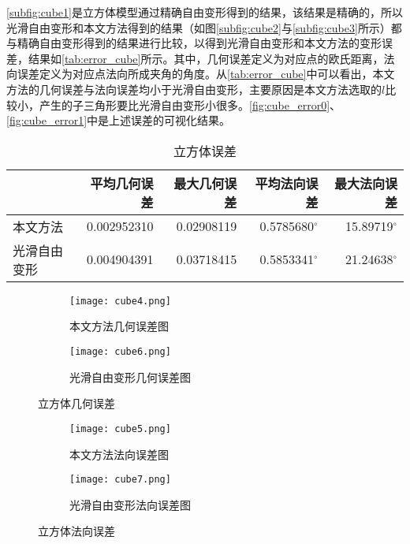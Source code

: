 \autoref{subfig:cube1}是立方体模型通过精确自由变形得到的结果，该结果是精确的，所以光滑自由变形和本文方法得到的结果（如图\autoref{subfig:cube2}与\autoref{subfig:cube3}所示）都与精确自由变形得到的结果进行比较，以得到光滑自由变形和本文方法的变形误差，结果如\autoref{tab:error_cube}所示。其中，几何误差定义为对应点的欧氏距离，法向误差定义为对应点法向所成夹角的角度。从\autoref{tab:error_cube}中可以看出，本文方法的几何误差与法向误差均小于光滑自由变形，主要原因是本文方法选取的$l$比较小，产生的子三角形要比光滑自由变形小很多。\autoref{fig:cube_error0}、\autoref{fig:cube_error1}中是上述误差的可视化结果。

\begin{table}[htbp]
    \centering
    \begin{tabular}{lrrrr}
    \toprule
                    & 平均几何误差 & 最大几何误差 & 平均法向误差 & 最大法向误差 \\
    \midrule
        本文方法    & \num{0.002952310} & \num{0.02908119} & \num[scientific-notation=false]{0.5785680}$^\circ$ & \num[scientific-notation=false]{15.89719}$^\circ$ \\
        光滑自由变形& \num{0.004904391} & \num{0.03718415} & \num[scientific-notation=false]{0.5853341}$^\circ$ & \num[scientific-notation=false]{21.24638}$^\circ$ \\
    \bottomrule
    \end{tabular}
    \caption{立方体误差} \label{tab:error_cube}
\end{table}

\begin{figure}[htbp]
	\centering
	\begin{subfigure}[b]{.45\textwidth}
		\centering
		\texttt{[image: cube4.png]}
		\caption{本文方法几何误差图}\label{subfig:cube4}
	\end{subfigure}%
	\begin{subfigure}[b]{.45\textwidth}
		\centering
		\texttt{[image: cube6.png]}
		\caption{光滑自由变形几何误差图}\label{subfig:cube6}
	\end{subfigure}
	\caption{立方体几何误差}\label{fig:cube_error0}
\end{figure}
\begin{figure}[htbp]
	\centering
	\begin{subfigure}[b]{.45\textwidth}
		\centering
		\texttt{[image: cube5.png]}
		\caption{本文方法法向误差图}\label{subfig:cube5}
	\end{subfigure}%
	\begin{subfigure}[b]{.45\textwidth}
		\centering
		\texttt{[image: cube7.png]}
		\caption{光滑自由变形法向误差图}\label{subfig:cube7}
	\end{subfigure}
	\caption{立方体法向误差}\label{fig:cube_error1}
\end{figure}

